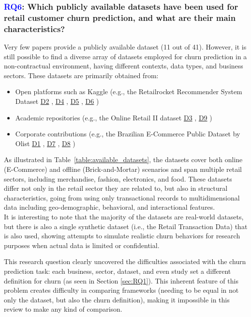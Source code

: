 \documentclass[preprint,12pt]{elsarticle}
\newcommand{\sid}[1]{\hyperlink{#1}{#1}}
\newcommand{\RQlabel}[1]{\textcolor{blue}{#1}}
\newcommand{\RSRQsix}{\RQlabel{RQ6}: Which publicly available datasets have been used for retail customer churn prediction, and what are their main characteristics?}
\begin{document}
\subsubsection{\RSRQsix}
\label{sec:RQ6}
Very few papers provide a publicly available dataset (11 out of 41). However, it is still possible to find a diverse array of datasets employed for churn prediction in a non-contractual environment, having different contexts, data types, and business sectors. These datasets are primarily obtained from:
\begin{itemize}
    \item Open platforms such as Kaggle (e.g., the Retailrocket Recommender System Dataset \sid{D2} \cite{Dat2-verma2021ecommerce}, \sid{D4} \cite{Dat4-retailrocket2017dataset}, \sid{D5} \cite{Dat5-usmani2020pakistan}, \sid{D6} \cite{Dat6-regivm2021retail})
    \item Academic repositories (e.g., the Online Retail II dataset \sid{D3} \cite{Dat3-uci2021online}, \sid{D9} \cite{Dat9-recsyswiki2015grocery})
    \item Corporate contributions (e.g., the Brazilian E-Commerce Public Dataset by Olist \sid{D1} \cite{Dat1-olist2018brazilian}, \sid{D7} \cite{Dat7-dunnhumby2021source}, \sid{D8} \cite{Dat8-dunnhumby2021source})
\end{itemize}
\nocite{Dat1-olist2018brazilian, Dat2-verma2021ecommerce, Dat3-uci2021online, Dat4-retailrocket2017dataset, Dat5-usmani2020pakistan, Dat6-regivm2021retail, Dat7-dunnhumby2021source, Dat8-dunnhumby2021source, Dat9-recsyswiki2015grocery}

As illustrated in Table~\ref{table:available_datasets}, the datasets cover both online (E-Commerce) and offline (Brick-and-Mortar) scenarios and span multiple retail sectors, including merchandise, fashion, electronics, and food. These datasets differ not only in the retail sector they are related to, but also in structural characteristics, going from using only transactional records to multidimensional data including geo-demographic, behavioral, and interactional features. \\
It is interesting to note that the majority of the datasets are real-world datasets, but there is also a single synthetic dataset (i.e., the Retail Transaction Data) that is also used, showing attempts to simulate realistic churn behaviors for research purposes when actual data is limited or confidential. 

This research question clearly uncovered the difficulties associated with the churn prediction task: each business, sector, dataset, and even study set a different definition for churn (as seen in Section \ref{sec:RQ1}). This inherent feature of this problem creates difficulty in comparing frameworks (needing to be equal in not only the dataset, but also the churn definition), making it impossible in this review to make any kind of comparison.
\end{document}
